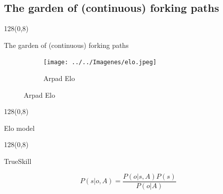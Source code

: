 \documentclass[shownotes]{beamer}
\begin{document}
\subsection{The garden of (continuous) forking paths }

\begin{frame}
 \begin{textblock}{128}(0,8)
\begin{center}
 \large The garden of (continuous) forking paths 
\end{center}
\end{textblock}
\vspace{1.25cm}




  \begin{figure}[H]     
     \centering \normalsize
     \begin{subfigure}[b]{0.4\textwidth}
       \texttt{[image: ../../Imagenes/elo.jpeg]} 
       \caption*{Arpad Elo}
     \end{subfigure}
\end{figure}

\end{frame}

\begin{frame}
 \begin{textblock}{128}(0,8)
\begin{center}
 \normalsize Elo model
\end{center}
\end{textblock}


\end{frame}

\begin{frame}
 \begin{textblock}{128}(0,8)
\begin{center}
 \normalsize TrueSkill
\end{center}
\end{textblock}
\vspace{0.5cm}

 
 
\begin{equation*}
 P(s|o,A) = \frac{P(o|s,A)P(s)}{P(o|A)}
\end{equation*}

 
\end{frame}
\end{document}
